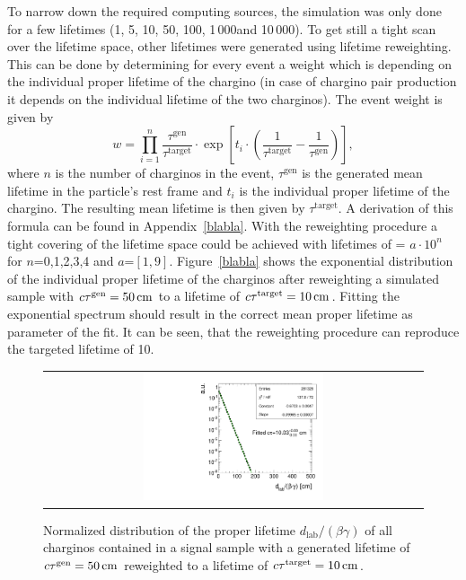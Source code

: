 To narrow down the required computing sources, the simulation was only done for a few lifetimes (1\cm, 5\cm, 10\cm, 50\cm, 100\cm, 1\,000\cm and 10\,000\cm).
To get still a tight scan over the lifetime space, other lifetimes were generated using lifetime reweighting.
This can be done by determining for every event a weight which is depending on the individual proper lifetime of the chargino (in case of chargino pair production it depends on the individual lifetime of the two charginos).
The event weight is given by
\begin{equation*}
w = \prod_{i=1}^n \frac{\tau^{\text{gen}}}{\tau^{\text{target}}}\cdot  \exp \left[ t_i \cdot \left( \frac{1}{\tau^{\text{target}}} - \frac{1}{\tau^{\text{gen}}} \right) \right] ,
\end{equation*}
where $n$ is the  number of charginos in the event, $\tau^{\text{gen}}$ is the generated mean lifetime in the particle's rest frame and $t_i$ is the individual proper lifetime of the chargino. 
The resulting mean lifetime is then given by $\tau^{\text{target}}$. A derivation of this formula can be found in Appendix~\ref{blabla}.
With the reweighting procedure a tight covering of the lifetime space could be achieved with lifetimes of \ctau = $a\cdot10^{n}$ for $n$=0,1,2,3,4 and $a$=$\left[1,9\right]$.
Figure~\ref{blabla} shows the exponential distribution of the individual proper lifetime of the charginos after reweighting a simulated sample with $c\tau^{\text{gen}}=50\,\text{cm}$ to a lifetime of $c\tau^{\text{target}}=10\,\text{cm}$.
Fitting the exponential spectrum should result in the correct mean proper lifetime as parameter of the fit.
It can be seen, that the reweighting procedure can reproduce the targeted lifetime of 10\cm.
\begin{figure}[!t]
  \centering 
  \begin{tabular}{c}
    \includegraphics[width=0.49\textwidth]{figures/analysis/10cm.pdf}
  \end{tabular}
  \caption{Normalized distribution of the proper lifetime $d_{\text{lab}}/\left(\beta\gamma \right)$ of all charginos contained in a signal sample with a generated lifetime of $c\tau^{\text{gen}}=50\,\text{cm}$ reweighted to a lifetime of $c\tau^{\text{target}}=10\,\text{cm}$.}
  \label{fig:FeynmanDiagram}
\end{figure}


